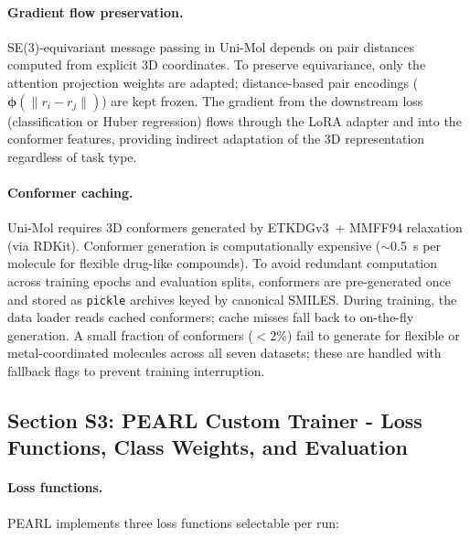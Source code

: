 \documentclass[9pt,a4paper]{article}
\begin{document}
\paragraph{Gradient flow preservation.}
SE(3)-equivariant message passing in Uni-Mol depends on pair distances computed
from explicit 3D coordinates.
To preserve equivariance, only the attention projection weights are adapted;
distance-based pair encodings ($\boldsymbol{\phi}(\|r_i - r_j\|)$) are kept frozen.
The gradient from the downstream loss (classification or Huber regression) flows
through the LoRA adapter and into the conformer features,
providing indirect adaptation of the 3D representation regardless of task type.

\paragraph{Conformer caching.}
Uni-Mol requires 3D conformers generated by ETKDGv3~+ MMFF94 relaxation (via RDKit).
Conformer generation is computationally expensive ($\sim$0.5~s per molecule for
flexible drug-like compounds).
To avoid redundant computation across training epochs and evaluation splits,
conformers are pre-generated once and stored as
\texttt{pickle} archives keyed by canonical SMILES.
During training, the data loader reads cached conformers; cache misses fall back
to on-the-fly generation. A small fraction of conformers ($<2\%$) fail to generate
for flexible or metal-coordinated molecules across all seven datasets; these are
handled with fallback flags to prevent training interruption.

\subsection*{Section S3: PEARL Custom Trainer - Loss Functions, Class Weights,
and Evaluation}

\paragraph{Loss functions.}
PEARL implements three loss functions selectable per run:
\end{document}
